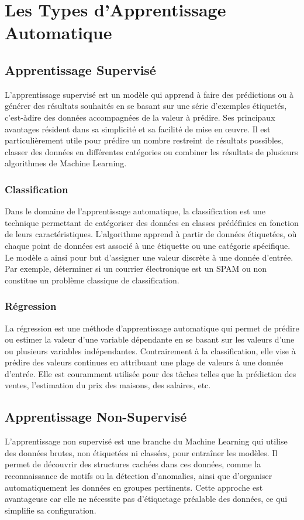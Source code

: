 \chapter{Les Types d’Apprentissage Automatique}
\label{chap:types}

\section{Apprentissage Supervisé}
\label{sec:supervise}
L’apprentissage supervisé est un modèle qui apprend à faire des prédictions ou à générer des résultats souhaités en se basant sur une série d'exemples étiquetés, c'est-àdire des données accompagnées de la valeur à prédire. Ses principaux avantages
résident dans sa simplicité et sa facilité de mise en œuvre. Il est particulièrement utile pour prédire un nombre restreint de résultats possibles, classer des données en différentes catégories ou combiner les résultats de plusieurs algorithmes de Machine Learning.


\subsection{Classification}
Dans le domaine de l'apprentissage automatique, la classification est une technique permettant de catégoriser des données en classes prédéfinies en fonction de leurs caractéristiques. L'algorithme apprend à partir de données étiquetées, où chaque point
de données est associé à une étiquette ou une catégorie spécifique. Le modèle a ainsi pour but d'assigner une valeur discrète à une donnée d'entrée. Par exemple, déterminer si un courrier électronique est un SPAM ou non constitue un problème classique de classification.


\subsection{Régression}
La régression est une méthode d'apprentissage automatique qui permet de prédire ou estimer la valeur d'une variable dépendante en se basant sur les valeurs d'une ou plusieurs variables indépendantes. Contrairement à la classification, elle vise à prédire des valeurs continues en attribuant une plage de valeurs à une donnée d'entrée. Elle est couramment utilisée pour des tâches telles que la prédiction des ventes, l'estimation du prix des maisons, des salaires, etc.

\section{Apprentissage Non-Supervisé}
\label{sec:non-supervise}
L'apprentissage non supervisé est une branche du Machine Learning qui utilise des données brutes, non étiquetées ni classées, pour entraîner les modèles. Il permet de découvrir des structures cachées dans ces données, comme la reconnaissance de motifs
ou la détection d'anomalies, ainsi que d'organiser automatiquement les données en groupes pertinents. Cette approche est avantageuse car elle ne nécessite pas d'étiquetage préalable des données, ce qui simplifie sa configuration.


